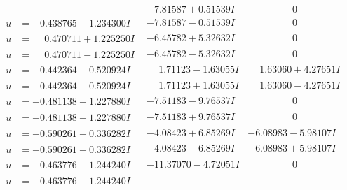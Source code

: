 \documentclass[1p]{elsarticle_modified}
\theoremstyle{definition}
\begin{document}
$$\begin{array}{c|c|c}
 & -7.81587 + 0.51539 I & \phantom{-0.000000 } 0 \\ \hline\begin{aligned}
u &= -0.438765 - 1.234300 I\end{aligned}
 & -7.81587 - 0.51539 I & \phantom{-0.000000 } 0 \\ \hline\begin{aligned}
u &= \phantom{-}0.470711 + 1.225250 I\end{aligned}
 & -6.45782 + 5.32632 I & \phantom{-0.000000 } 0 \\ \hline\begin{aligned}
u &= \phantom{-}0.470711 - 1.225250 I\end{aligned}
 & -6.45782 - 5.32632 I & \phantom{-0.000000 } 0 \\ \hline\begin{aligned}
u &= -0.442364 + 0.520924 I\end{aligned}
 & \phantom{-}1.71123 - 1.63055 I & \phantom{-}1.63060 + 4.27651 I \\ \hline\begin{aligned}
u &= -0.442364 - 0.520924 I\end{aligned}
 & \phantom{-}1.71123 + 1.63055 I & \phantom{-}1.63060 - 4.27651 I \\ \hline\begin{aligned}
u &= -0.481138 + 1.227880 I\end{aligned}
 & -7.51183 - 9.76537 I & \phantom{-0.000000 } 0 \\ \hline\begin{aligned}
u &= -0.481138 - 1.227880 I\end{aligned}
 & -7.51183 + 9.76537 I & \phantom{-0.000000 } 0 \\ \hline\begin{aligned}
u &= -0.590261 + 0.336282 I\end{aligned}
 & -4.08423 + 6.85269 I & -6.08983 - 5.98107 I \\ \hline\begin{aligned}
u &= -0.590261 - 0.336282 I\end{aligned}
 & -4.08423 - 6.85269 I & -6.08983 + 5.98107 I \\ \hline\begin{aligned}
u &= -0.463776 + 1.244240 I\end{aligned}
 & -11.37070 - 4.72051 I & \phantom{-0.000000 } 0 \\ \hline\begin{aligned}
u &= -0.463776 - 1.244240 I\end{aligned}

\end{array}$$
\end{document}
